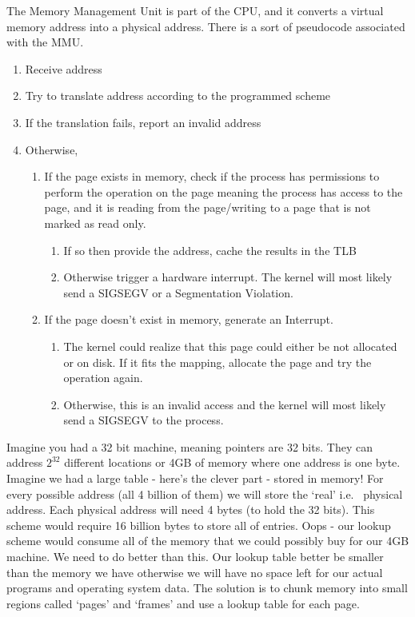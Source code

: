 The Memory Management Unit is part of the CPU, and it converts a virtual memory address into a physical address. There is a sort of pseudocode associated with the MMU.

\begin{enumerate}
\item Receive address
\item Try to translate address according to the programmed scheme
\item If the translation fails, report an invalid address
\item Otherwise,
	\begin{enumerate}
	\item If the page exists in memory, check if the process has permissions
		to perform the operation on the page meaning the process has access
		to the page, and it is reading from the page/writing to a page
		that is not marked as read only.
		\begin{enumerate}
		\item If so then provide the address, cache the results in the TLB
		\item Otherwise trigger a hardware interrupt. The kernel 
			will most likely send a SIGSEGV or a Segmentation Violation.
		\end{enumerate}
	\item If the page doesn't exist in memory, generate an Interrupt.
		\begin{enumerate}
		\item The kernel could realize that this page could either be not
			allocated or on disk. If it fits the mapping, allocate the page
			and try the operation again.
		\item Otherwise, this is an invalid access and the kernel will most
			likely send a SIGSEGV to the process.
		\end{enumerate}
	\end{enumerate}
\end{enumerate}

Imagine you had a 32 bit machine, meaning pointers are 32 bits. They can address $2^{32}$ different locations or 4GB of memory where one address is one byte. Imagine we had a large table - here's the clever part - stored in memory! For every possible address (all 4 billion of them) we will store the `real' i.e. ~physical address. Each physical address will need 4 bytes (to hold the 32 bits). This scheme would require 16 billion bytes to store all of entries. Oops - our lookup scheme would consume all of the memory that we could possibly buy for our 4GB machine. We need to do better than this. Our lookup table better be smaller than the memory we have otherwise we will have no space left for our actual programs and operating system data. The solution is to chunk memory into small regions called `pages' and `frames' and use a lookup table for each page.

